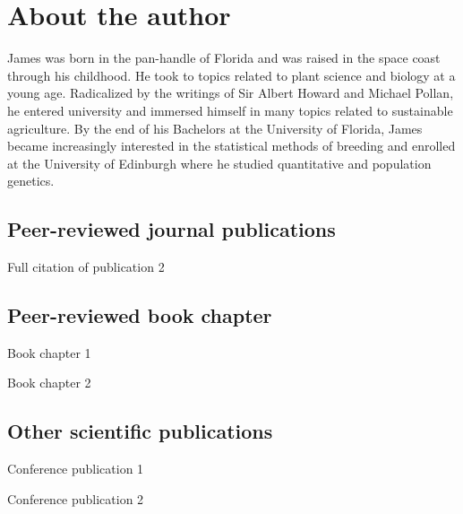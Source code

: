 \chapter{About the author}

James was born in the pan-handle of Florida and was raised in the space coast through his childhood. He took to topics related to plant science and biology at a young age. Radicalized by the writings of Sir Albert Howard and Michael Pollan, he entered university and immersed himself in many topics related to sustainable agriculture. By the end of his Bachelors at the University of Florida, James became increasingly interested in the statistical methods of breeding and enrolled at the University of Edinburgh where he studied quantitative and population genetics.

\section*{Peer-reviewed journal publications}


Full citation of publication 2


\section*{Peer-reviewed book chapter}

Book chapter 1

Book chapter 2

\section*{Other scientific publications}

Conference publication 1

Conference publication 2
